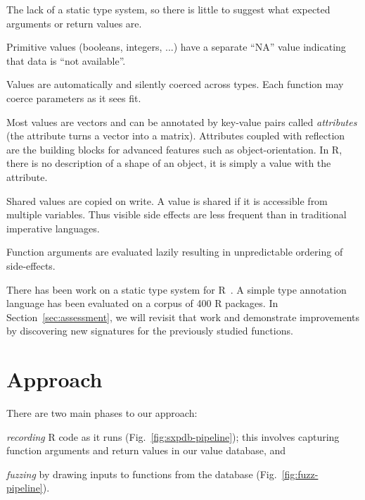 \documentclass[sigplan,screen]{acmart}
\begin{document}
\begin{compactitem}[$-$]
\item The lack of a static type system, so there is
  little to suggest what expected arguments or return values are.
\item Primitive values (booleans, integers, ...)  have a separate
  ``NA'' value indicating that data is ``not available''.
\item Values are automatically and silently coerced across types.
  Each function may coerce parameters as it sees fit.
\item Most values are vectors and can be annotated by key-value pairs
  called \textit{attributes} (\Eg the  attribute turns a vector into a matrix).
  Attributes coupled with reflection are
  the building blocks for advanced features such as
  object-orientation.  In R, there is no description of a shape of an
  object, it is simply a value with the  attribute.
\item Shared values are copied on write. A value is shared if it is
  accessible from multiple variables. Thus visible side effects are less
  frequent than in traditional imperative languages.
\item Function arguments are evaluated lazily resulting in unpredictable
  ordering of side-effects.
\end{compactitem}

There has been work on a static type system for
R~\cite{turcotte2020designing}.  A simple type annotation language has
been evaluated on a corpus of 400 R packages. In Section~\ref{sec:assessment}, we will revisit that work and demonstrate improvements
by discovering new signatures for the previously studied functions.

\section{Approach}

There are two main phases to our approach:
%
\begin{inparaenum}[(1)]
\item \emph{recording} R code as it runs (Fig.~\ref{fig:sxpdb-pipeline}); this involves capturing
  function arguments and return values in our value database, and
\item \emph{fuzzing} by drawing inputs to functions from the database (Fig.~\ref{fig:fuzz-pipeline}).
\end{inparaenum}
\end{document}
